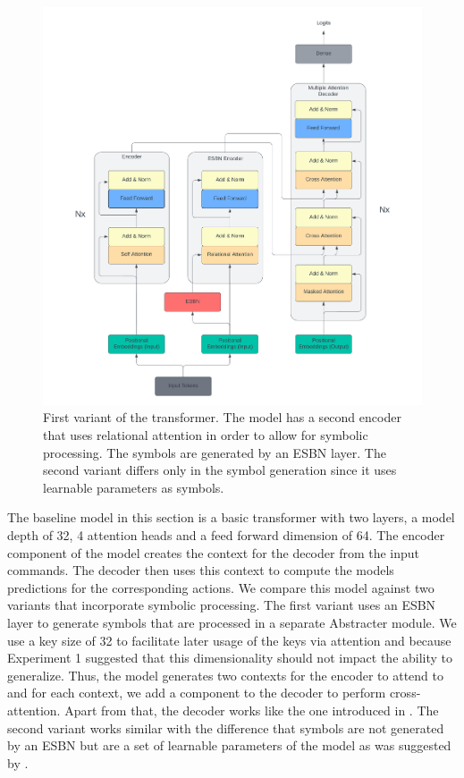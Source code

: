 \begin{figure}
    \centering
    \includegraphics[width=1.0\linewidth]{images/Transformer_Abstracter_ESBN.png}
    \caption{First variant of the transformer. The model has a second encoder that uses relational attention \textcite{altabaa_abstractors_2023} in order to allow for symbolic processing. The symbols are generated by an ESBN layer. The second variant differs only in the symbol generation since it uses learnable parameters as symbols.}
    \label{fig:esbn_transformer}
\end{figure}

The baseline model in this section is a basic transformer \textcite{vaswani_attention_2023} with two layers, a model depth of 32, 4 attention heads and a feed forward dimension of 64. The encoder component of the model creates the context for the decoder from the input commands. The decoder then uses this context to compute the models predictions for the corresponding actions. \newline
We compare this model against two variants that incorporate symbolic processing. The first variant uses an ESBN layer to generate symbols that are processed in a separate Abstracter \textcite{altabaa_abstractors_2023} module. We use a key size of 32 to facilitate later usage of the keys via attention and because Experiment 1 suggested that this dimensionality should not impact the ability to generalize.  \newline 
Thus, the model generates two contexts for the encoder to attend to and for each context, we add a component to the decoder to perform cross-attention. Apart from that, the decoder works like the one introduced in \textcite{vaswani_attention_2023}. The second variant works similar with the difference that symbols are not generated by an ESBN but are a set of learnable parameters of the model as was suggested by \textcite{altabaa_abstractors_2023}.

